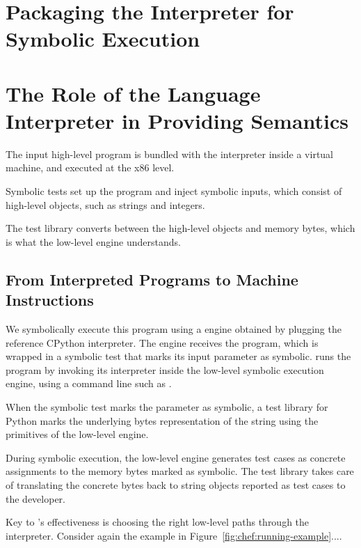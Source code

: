 
\section{Packaging the Interpreter for Symbolic Execution}
\label{sec:chef:recipe}

\section{The Role of the Language Interpreter in Providing Semantics}

The input high-level program is bundled with the interpreter inside a virtual machine, and executed at the x86 level.

Symbolic tests set up the program and inject symbolic inputs, which consist of high-level objects, such as strings and integers.

The test library converts between the high-level objects and memory bytes, which is what the low-level engine understands.

\subsection{From Interpreted Programs to Machine Instructions}

We symbolically execute this program using a \chef engine obtained by plugging the reference CPython interpreter.
%
The \chef engine receives the program, which is wrapped in a symbolic test that marks its input parameter  as symbolic.
%
\chef runs the program by invoking its interpreter inside the low-level symbolic execution engine, using a command line such as .

When the symbolic test marks the  parameter as symbolic, a \chef test library for Python marks the underlying bytes representation of the string using the primitives of the low-level engine.

During symbolic execution, the low-level engine generates test cases as concrete assignments to the memory bytes marked as symbolic.
%
The \chef test library takes care of translating the concrete bytes back to string objects reported as test cases to the developer.

Key to \chef's effectiveness is choosing the right low-level paths through the interpreter.
%
Consider again the example in Figure~\ref{fig:chef:running-example}....

